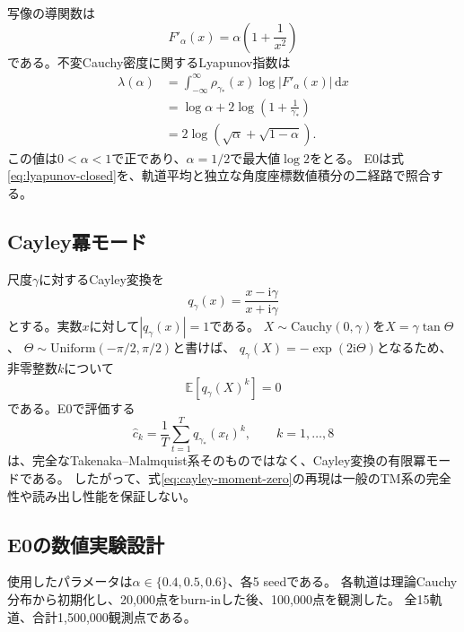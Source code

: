 \documentclass[a4paper,11pt]{jlreq}
\newcommand{\E}{\mathbb{E}}
\newcommand{\ii}{\mathrm{i}}
\begin{document}
写像の導関数は
\begin{equation}
    F'_{\alpha}(x)=\alpha\left(1+\frac{1}{x^2}\right)
\end{equation}
である。不変Cauchy密度に関するLyapunov指数は
\begin{align}
    \lambda(\alpha)
    &=\int_{-\infty}^{\infty}
      \rho_{\gamma_{\ast}}(x)
      \log\left|F'_{\alpha}(x)\right|\,\mathrm{d}x \\
    &=\log\alpha
      +2\log\left(1+\frac{1}{\gamma_{\ast}}\right) \\
    &=2\log\left(\sqrt{\alpha}+\sqrt{1-\alpha}\right).
    \label{eq:lyapunov-closed}
\end{align}
この値は$0<\alpha<1$で正であり、$\alpha=1/2$で最大値$\log 2$をとる。
E0は式\eqref{eq:lyapunov-closed}を、軌道平均と独立な角度座標数値積分の二経路で照合する。

\subsection{Cayley冪モード}

尺度$\gamma$に対するCayley変換を
\begin{equation}
    q_{\gamma}(x)=\frac{x-\ii\gamma}{x+\ii\gamma}
    \label{eq:cayley}
\end{equation}
とする。実数$x$に対して$|q_{\gamma}(x)|=1$である。
$X\sim\mathrm{Cauchy}(0,\gamma)$を$X=\gamma\tan\Theta$、
$\Theta\sim\mathrm{Uniform}(-\pi/2,\pi/2)$と書けば、
$q_{\gamma}(X)=-\exp(2\ii\Theta)$となるため、非零整数$k$について
\begin{equation}
    \E\left[q_{\gamma}(X)^k\right]=0
    \label{eq:cayley-moment-zero}
\end{equation}
である。E0で評価する
\begin{equation}
    \widehat c_k
    =\frac{1}{T}\sum_{t=1}^{T}q_{\gamma_{\ast}}(x_t)^k,
    \qquad k=1,\ldots,8
    \label{eq:e0-cayley-coefficient}
\end{equation}
は、完全なTakenaka--Malmquist系そのものではなく、Cayley変換の有限冪モードである。
したがって、式\eqref{eq:cayley-moment-zero}の再現は一般のTM系の完全性や読み出し性能を保証しない。

\subsection{E0の数値実験設計}

使用したパラメータは$\alpha\in\{0.4,0.5,0.6\}$、各5 seedである。
各軌道は理論Cauchy分布から初期化し、20,000点をburn-inした後、100,000点を観測した。
全15軌道、合計1,500,000観測点である。
\end{document}
